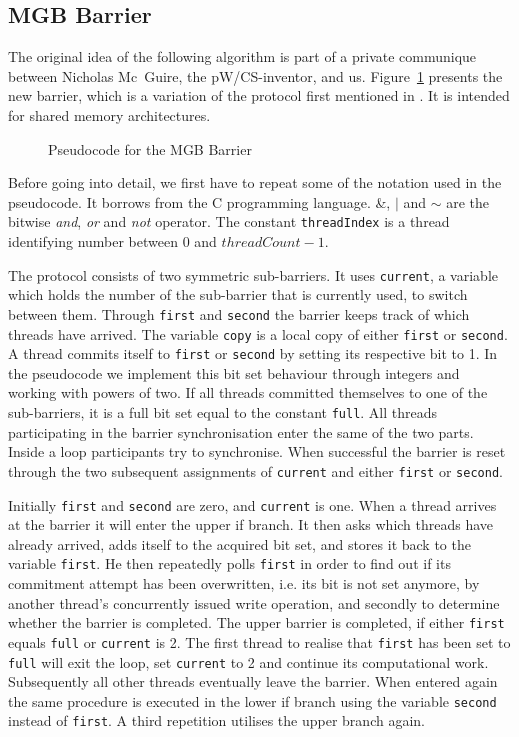 \documentclass[a4paper, 10pt]{article}
\begin{document}
\subsection{MGB Barrier}
\label{ssec:new-mgb}
The original idea of the following algorithm is part of a private communique between Nicholas Mc~Guire, the pW/CS-inventor, and us. Figure~\ref{fig:pseudocode-mgb} presents the new barrier, which is a variation of the protocol first mentioned in \cite{bre13}. It is intended for shared memory architectures.

\begin{figure}[htbp]
	\centering
	
	\caption{Pseudocode for the MGB Barrier}
	\label{fig:pseudocode-mgb}
\end{figure}

Before going into detail, we first have to repeat some of the notation used in the pseudocode. It borrows from the C programming language. \&, $|$ and $\sim$ are the bitwise \emph{and}, \emph{or} and \emph{not} operator. The constant \texttt{threadIndex} is a thread identifying number between 0 and $\mathit{threadCount}-1$.

The protocol consists of two symmetric sub-barriers. It uses \texttt{current}, a variable which holds the number of the sub-barrier that is currently used, to switch between them.
Through \texttt{first} and \texttt{second} the barrier keeps track of which threads have arrived.
The variable \texttt{copy} is a local copy of either \texttt{first} or \texttt{second}.
A thread commits itself to \texttt{first} or \texttt{second} by setting its respective bit to 1. In the pseudocode we implement this bit set behaviour through integers and working with powers of two. If all threads committed themselves to one of the sub-barriers, it is a full bit set equal to the constant \texttt{full}.
All threads participating in the barrier synchronisation enter the same of the two parts.
Inside a loop participants try to synchronise. When successful the barrier is reset through the two subsequent assignments of \texttt{current} and either \texttt{first} or \texttt{second}.

Initially \texttt{first} and \texttt{second} are zero, and \texttt{current} is one. When a thread arrives at the barrier it will enter the upper if branch. It then asks which threads have already arrived, adds itself to the acquired bit set, and stores it back to the variable \texttt{first}.
He then repeatedly polls \texttt{first} in order to find out if its commitment attempt has been overwritten, i.e. its bit is not set anymore, by another thread's concurrently issued write operation, and secondly to determine whether the barrier is completed. The upper barrier is completed, if either \texttt{first} equals \texttt{full} or \texttt{current} is 2. The first thread to realise that \texttt{first} has been set to \texttt{full} will exit the loop, set \texttt{current} to 2 and continue its computational work. Subsequently all other threads eventually leave the barrier.
When entered again the same procedure is executed in the lower if branch using the variable \texttt{second} instead of \texttt{first}. A third repetition utilises the upper branch again.
\end{document}
